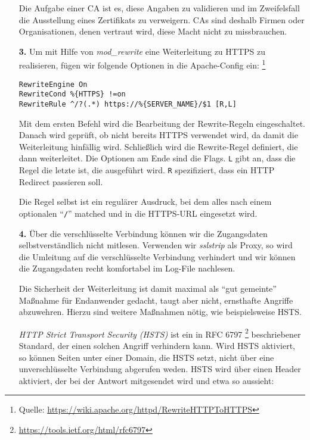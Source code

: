 \documentclass[a4paper,12bpt]{scrartcl}
\begin{document}
\begin{enumerate}
        Die Aufgabe einer CA ist es, diese Angaben zu validieren und im Zweifelsfall
        die Ausstellung eines Zertifikats zu verweigern. CAs sind deshalb Firmen
        oder Organisationen, denen vertraut wird, diese Macht nicht zu missbrauchen.

    \item[\bfseries 3.]
        Um mit Hilfe von \textit{mod\_rewrite} eine Weiterleitung zu HTTPS zu
        realisieren, fügen wir folgende Optionen in die Apache-Config ein:%
        \footnote{Quelle: \url{https://wiki.apache.org/httpd/RewriteHTTPToHTTPS}}

        \begin{lstlisting}
RewriteEngine On
RewriteCond %{HTTPS} !=on
RewriteRule ^/?(.*) https://%{SERVER_NAME}/$1 [R,L]
        \end{lstlisting}

        Mit dem ersten Befehl wird die Bearbeitung der Rewrite-Regeln eingeschaltet.
        Danach wird geprüft, ob nicht bereits HTTPS verwendet wird, da damit die
        Weiterleitung hinfällig wird. Schließlich wird die Rewrite-Regel definiert,
        die dann weiterleitet. Die Optionen am Ende sind die Flags. \texttt{L}
        gibt an, dass die Regel die letzte ist, die ausgeführt wird. \texttt{R}
        spezifiziert, dass ein HTTP Redirect passieren soll.

        Die Regel selbst ist ein regulärer Ausdruck, bei dem alles nach einem
        optionalen ``\texttt{/}'' matched und in die HTTPS-URL eingesetzt wird.

    \item[\bfseries 4.]
        Über die verschlüsselte Verbindung können wir die Zugangsdaten
        selbstverständlich nicht mitlesen. Verwenden wir \textit{sslstrip} als
        Proxy, so wird die Umleitung auf die verschlüsselte Verbindung verhindert
        und wir können die Zugangsdaten recht komfortabel im Log-File nachlesen.

        Die Sicherheit der Weiterleitung ist damit maximal als ``gut gemeinte''
        Maßnahme für Endanwender gedacht, taugt aber nicht, ernsthafte Angriffe
        abzuwehren. Hierzu sind weitere Maßnahmen nötig, wie beispielsweise HSTS.

        \textit{HTTP Strict Transport Security (HSTS)} ist ein in RFC 6797%
        \footnote{\url{https://tools.ietf.org/html/rfc6797}} beschriebener
        Standard, der einen solchen Angriff verhindern kann. Wird HSTS aktiviert,
        so können Seiten unter einer Domain, die HSTS setzt, nicht über eine
        unverschlüsselte Verbindung abgerufen weden.
        HSTS wird über einen Header aktiviert, der bei der Antwort mitgesendet
        wird und etwa so aussieht:


\end{enumerate}
\end{document}

